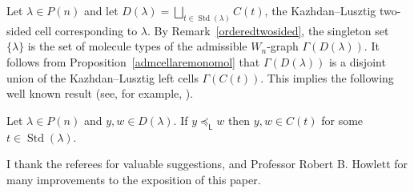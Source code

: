 \documentclass[ALCO,ThmDefs,Unicode,epreuves]{cedram}
\newcommand{\lside}{_{\mathsf{L}}}
\DeclareMathOperator{\STD}{Std}
\begin{document}
\begin{rema}\label{remontwosidedcells}
Let $\lambda\in P(n)$ and let $D(\lambda)=\bigsqcup_{t\in\STD(\lambda)}C(t)$,
the Kazhdan--Lusztig two-sided cell corresponding to $\lambda$.
By Remark~\ref{orderedtwosided}, the singleton set $\{\lambda\}$ is the set
of molecule types of the admissible $W_n$-graph $\Gamma(D(\lambda))$. It follows
from Proposition~\ref{admcellaremonomol} that $\Gamma(D(\lambda))$ is a disjoint union of
the Kazhdan--Lusztig left cells $\Gamma(C(t))$. This implies the following well known
result (see, for example, \cite[Theorem~5.3]{gecpfei:charHecke}).
\begin{theo}\label{xyinsameleftcell}
Let $\lambda\in P(n)$ and $y,w\in D(\lambda)$. If $y\preceq\lside w$
then $y,w\in C(t)$ for some $t\in\STD(\lambda)$.
\end{theo}
\end{rema}

\longthanks
I thank the referees for valuable suggestions, and Professor Robert B. Howlett for many improvements to the
exposition of this paper.

\nocite{*}


\end{document}
